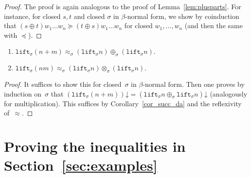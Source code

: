 \documentclass[a4paper,UKenglish,cleveref,autoref,numberwithinsect]{lipics-v2019}
\theoremstyle{definition}
\newcommand{\lift}{\mathtt{lift}}
\newcommand{\refsec}[1]{Section~\ref{sec:#1}}
\newcommand{\da}{\mathord{\downarrow}}
\begin{document}
\begin{proof}
  The proof is again analogous to the proof of
  Lemma~\ref{lem:plusparts}. For instance, for closed $s,t$ and closed
  $\sigma$ in $\beta$-normal form, we show by coinduction that $(s
  \oplus t) w_1 \ldots w_n \succeq (t \oplus s) w_1 \ldots w_n$ for
  closed $w_1,\ldots,w_n$ (and then the same with $\preceq$).
\end{proof}

{ \renewcommand{\thelemma}{\ref{lem_lift_approx}}
\begin{lemma}
  \begin{enumerate}
  \item $\lift_\sigma(n+m) \approx_\sigma (\lift_\sigma n)
    \oplus_\sigma (\lift_\sigma n)$.
  \item $\lift_\sigma(n m) \approx_\sigma (\lift_\sigma n)
    \otimes_\sigma (\lift_\sigma n)$.
  \end{enumerate}
\end{lemma}
\addtocounter{theorem}{-1}}

\begin{proof}
  It suffices to show this for closed~$\sigma$ in $\beta$-normal
  form. Then one proves by induction on~$\sigma$ that
  $(\lift_\sigma(n+m))\da = (\lift_\sigma n \oplus_\sigma \lift_\sigma
  n)\da$ (analogously for multiplication). This suffices by
  Corollary~\ref{cor_succ_da} and the reflexivity of~$\approx$.
\end{proof}

\section{Proving the inequalities in \refsec{examples}}\label{app_ineqs}
\end{document}
